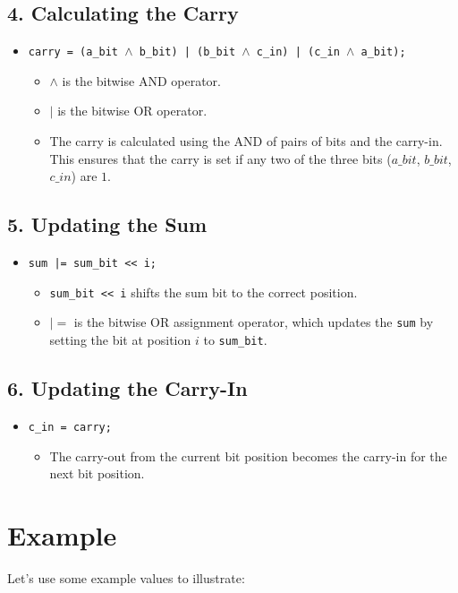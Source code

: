 \documentclass{article}
\begin{document}
\subsection*{4. Calculating the Carry}
\begin{itemize}
    \item \texttt{carry = (a\_bit \(\land\) b\_bit) | (b\_bit \(\land\) c\_in) | (c\_in \(\land\) a\_bit);}
    \begin{itemize}
        \item \(\land\) is the bitwise AND operator.
        \item \(|\) is the bitwise OR operator.
        \item The carry is calculated using the AND of pairs of bits and the carry-in. This ensures that the carry is set if any two of the three bits (\(a\_bit\), \(b\_bit\), \(c\_in\)) are \(1\).
    \end{itemize}
\end{itemize}

\subsection*{5. Updating the Sum}
\begin{itemize}
    \item \texttt{sum |= sum\_bit << i;}
    \begin{itemize}
        \item \texttt{sum\_bit << i} shifts the sum bit to the correct position.
        \item \(|=\) is the bitwise OR assignment operator, which updates the \texttt{sum} by setting the bit at position \(i\) to \texttt{sum\_bit}.
    \end{itemize}
\end{itemize}

\subsection*{6. Updating the Carry-In}
\begin{itemize}
    \item \texttt{c\_in = carry;}
    \begin{itemize}
        \item The carry-out from the current bit position becomes the carry-in for the next bit position.
    \end{itemize}
\end{itemize}

\section*{Example}
Let's use some example values to illustrate:
\end{document}
